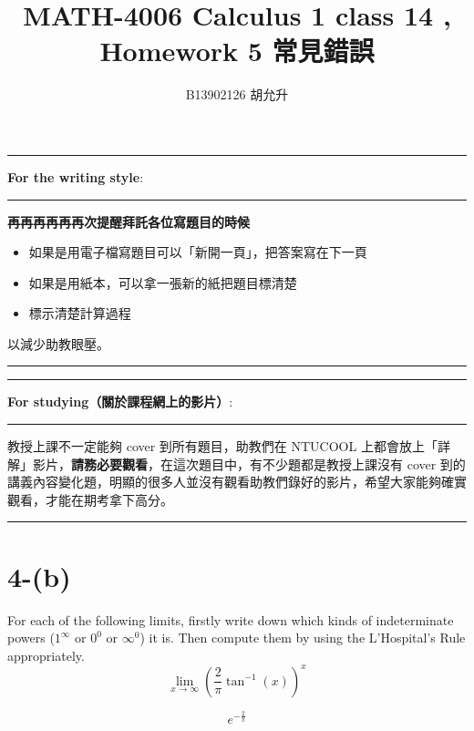 \documentclass{article}
\title{MATH-4006 Calculus 1 class 14 , Homework 5 常見錯誤}
\author{B13902126 胡允升}
\date{}
\begin{document}
\fontsize{12pt}{16pt}\selectfont

\maketitle  
\noindent\rule{\linewidth}{0.4pt}
\textbf{For the writing style}:

\noindent\rule{\linewidth}{0.4pt}
\textbf{再再再再再再次提醒拜託各位寫題目的時候}
\begin{itemize}
    \item 如果是用電子檔寫題目可以「新開一頁」，把答案寫在下一頁
    \item 如果是用紙本，可以拿一張新的紙把題目標清楚
    \item 標示清楚計算過程
\end{itemize}
以減少助教眼壓。

\noindent\rule{\linewidth}{0.4pt}

\vspace{2em}

\noindent\rule{\linewidth}{0.4pt}
\textbf{For studying（關於課程網上的影片）}:

\noindent\rule{\linewidth}{0.4pt}

教授上課不一定能夠 cover 到所有題目，助教們在 NTUCOOL 上都會放上「詳解」影片，\textbf{請務必要觀看}，在這次題目中，有不少題都是教授上課沒有 cover 到的講義內容變化題，明顯的很多人並沒有觀看助教們錄好的影片，希望大家能夠確實觀看，才能在期考拿下高分。

\noindent\rule{\linewidth}{0.4pt}


\newpage

\section{4-(b)}

\begin{problem}
For each of the following limits, firstly write down which kinds of indeterminate powers ($1^\infty$ or $0^0$ or $\infty^0$) it is. Then compute them by using the L'Hospital's Rule appropriately.
\[
\lim_{x \rightarrow \infty} \left(\frac{2}{\pi} \tan^{-1}(x) \right)^{x}
\]
\end{problem}
\vspace{-12pt}
\begin{cor}
	\[ e^{-\frac{2}{\pi}} \]
\end{cor}
\end{document}
